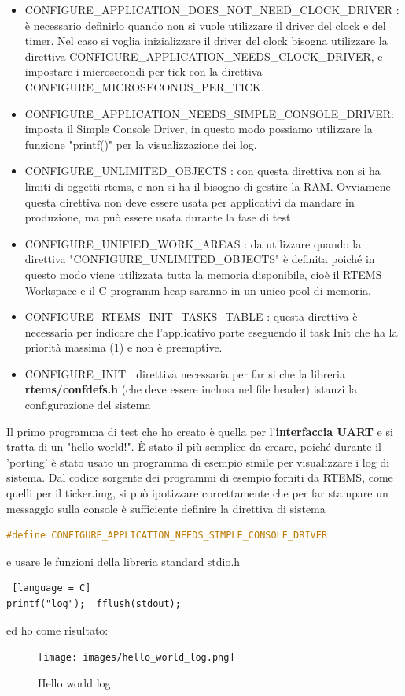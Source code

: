 \documentclass[12pt, a4paper, titlepage, oneside]{book}
\begin{document}
\begin{flushleft}
\begin{lstlisting}[style = CStyle]
\end{lstlisting}
\begin{itemize}
    \item CONFIGURE\_APPLICATION\_DOES\_NOT\_NEED\_CLOCK\_DRIVER : è necessario definirlo quando non si vuole utilizzare il driver del clock e del timer. Nel caso si voglia inizializzare il driver del clock bisogna utilizzare la direttiva CONFIGURE\_APPLICATION\_NEEDS\_CLOCK\_DRIVER, e impostare i microsecondi per tick con la direttiva CONFIGURE\_MICROSECONDS\_PER\_TICK.
    \item CONFIGURE\_APPLICATION\_NEEDS\_SIMPLE\_CONSOLE\_DRIVER: imposta il Simple Console Driver, in questo modo possiamo utilizzare la funzione "printf()" per la visualizzazione dei log.
    \item CONFIGURE\_UNLIMITED\_OBJECTS : con questa direttiva non si ha limiti di oggetti rtems, e non si ha il bisogno di gestire la RAM. Ovviamene questa direttiva non deve essere usata per applicativi da mandare in produzione, ma può essere usata durante la fase di test
    \item CONFIGURE\_UNIFIED\_WORK\_AREAS : da utilizzare quando la direttiva "CONFIGURE\_UNLIMITED\_OBJECTS" è definita poiché in questo modo viene utilizzata tutta la memoria disponibile, cioè  il  RTEMS Workspace e il C programm heap saranno in un unico pool di memoria.
    \item CONFIGURE\_RTEMS\_INIT\_TASKS\_TABLE : questa direttiva è necessaria per indicare che l'applicativo parte eseguendo il task Init che ha la priorità massima (1) e non è preemptive.
    \item CONFIGURE\_INIT : direttiva necessaria per far si che la libreria \textbf{rtems/confdefs.h} (che deve essere inclusa nel file header) istanzi la configurazione del sistema
\end{itemize}
Il primo programma di test che ho creato è quella per l'\textbf{interfaccia UART} e si tratta di un "hello world!". È stato il più semplice da creare, poiché durante il 'porting' è stato usato un programma di esempio simile per visualizzare i log di sistema. Dal codice sorgente dei programmi di esempio forniti da RTEMS, come quelli per il ticker.img,  si può ipotizzare correttamente che per far stampare un messaggio sulla console è sufficiente definire la direttiva di sistema 
\begin{lstlisting}[language = C]
#define CONFIGURE_APPLICATION_NEEDS_SIMPLE_CONSOLE_DRIVER 
\end{lstlisting} 
e usare le funzioni della libreria standard stdio.h \begin{lstlisting} [language = C]
printf("log");  fflush(stdout);
\end{lstlisting}
ed ho come risultato:
\begin{figure}[h]
    \centering
    \texttt{[image: images/hello\_world\_log.png]}
    \caption{Hello world log}
    \label{fig:hello_world_log}
\end{figure}


\end{flushleft}
\end{document}

